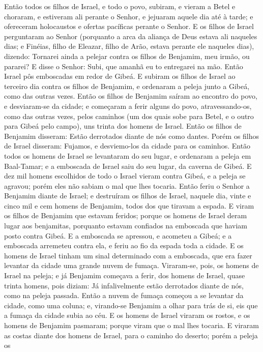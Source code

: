 Então todos os filhos de Israel, e todo o povo, subiram, e vieram
a Betel e choraram, e estiveram ali perante o Senhor, e jejuaram
aquele dia até à tarde; e ofereceram holocaustos e ofertas pacíficas
perante o Senhor. E os filhos de Israel perguntaram ao Senhor
(porquanto a arca da aliança de Deus estava ali naqueles dias;
e Finéias, filho de Eleazar, filho de Arão, estava perante
ele naqueles dias), dizendo: Tornarei ainda a pelejar contra os
filhos de Benjamim, meu irmão, ou pararei? E disse o Senhor: Subi,
que amanhã eu to entregarei na mão. Então Israel pôs
emboscadas em redor de Gibeá. E subiram os filhos de Israel
ao terceiro dia contra os filhos de Benjamim, e ordenaram a peleja
junto a Gibeá, como das outras vezes. Então os filhos de
Benjamim saíram ao encontro do povo, e desviaram-se da cidade; e
começaram a ferir alguns do povo, atravessando-os, como das outras
vezes, pelos caminhos (um dos quais sobe para Betel, e o outro para
Gibeá pelo campo), uns trinta dos homens de Israel. Então os
filhos de Benjamim disseram: Estão derrotados diante de nós como
dantes. Porém os filhos de Israel disseram: Fujamos, e desviemo-los
da cidade para os caminhos. Então todos os homens de Israel
se levantaram do seu lugar, e ordenaram a peleja em Baal-Tamar; e a
emboscada de Israel saiu do seu lugar, da caverna de Gibeá. E
dez mil homens escolhidos de todo o Israel vieram contra Gibeá, e a
peleja se agravou; porém eles não sabiam o mal que lhes tocaria.
Então feriu o Senhor a Benjamim diante de Israel; e
destruíram os filhos de Israel, naquele dia, vinte e cinco mil e cem
homens de Benjamim, todos dos que tiravam a espada. E viram
os filhos de Benjamim que estavam feridos; porque os homens de
Israel deram lugar aos benjamitas, porquanto estavam confiados na
emboscada que haviam posto contra Gibeá. E a emboscada se
apressou, e acometeu a Gibeá; e a emboscada arremeteu contra ela, e
feriu ao fio da espada toda a cidade. E os homens de Israel
tinham um sinal determinado com a emboscada, que era fazer levantar
da cidade uma grande nuvem de fumaça. Viraram-se, pois, os
homens de Israel na peleja; e já Benjamim começava a ferir, dos
homens de Israel, quase trinta homens, pois diziam: Já
infalivelmente estão derrotados diante de nós, como na peleja
passada. Então a nuvem de fumaça começou a se levantar da
cidade, como uma coluna; e, virando-se Benjamim a olhar para trás de
si, eis que a fumaça da cidade subia ao céu. E os homens de
Israel viraram os rostos, e os homens de Benjamim pasmaram; porque
viram que o mal lhes tocaria. E viraram as costas diante dos
homens de Israel, para o caminho do deserto; porém a peleja os
